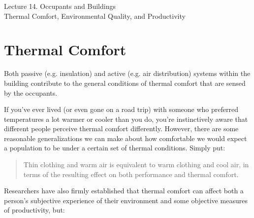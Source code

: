\documentclass[10pt]{article}
\begin{document}
   \noindent
   \begin{center}

   \hrulefill
   
   \vspace{5pt}
   
   \vspace{0pt}
   
   {\Large \hfill  Lecture 14. Occupants and Buildings\\ \hfill {\large Thermal Comfort, Environmental Quality, and Productivity}}
   \vspace{5pt}
   
  
   \hrulefill
   \end{center}

   {}

\section{Thermal Comfort}

Both passive (e.g. insulation) and active (e.g. air distribution) systems within the building contribute to the general conditions of thermal comfort that are sensed by the occupants.

If you've ever lived (or even gone on a road trip) with someone who preferred temperatures a lot warmer or cooler than you do, you're instinctively aware that different people perceive thermal comfort differently. However, there are some reasonable generalizations we can make about how comfortable we would expect a population to be under a certain set of thermal conditions. Simply put:

\begin{quote}
    Thin clothing and warm air is equivalent to warm clothing and cool air, in terms of the resulting effect on both performance and thermal comfort. \cite{Wargocki2017-ny}
\end{quote}

Researchers have also firmly established that thermal comfort can affect both a person's subjective experience of their environment and some objective measures of productivity, but:
\end{document}
